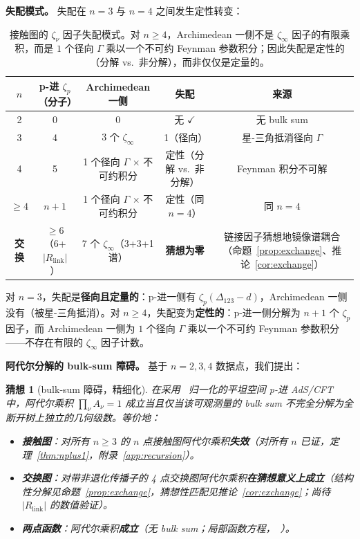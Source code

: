 \documentclass[11pt,a4paper]{ctexart}
\newtheorem{conjecture}{猜想}[section]
\theoremstyle{remark}
\begin{document}
\medskip\noindent
\textbf{失配模式。}
失配在 $n = 3$ 与 $n = 4$ 之间发生定性转变：

\begin{table}[H]
\centering
\caption{接触图的 $\zeta_\nu$ 因子失配模式。对 $n \geq 4$，Archimedean 一侧不是 $\zeta_\infty$ 因子的有限乘积，而是 $1$ 个径向 $\Gamma$ 乘以一个不可约 Feynman 参数积分；因此失配是定性的（分解 vs.\ 非分解），而非仅仅是定量的。}
\label{tab:mismatch}
\begin{tabular}{ccccc}
\toprule
$n$ & p-进 $\zeta_p$（分子） & Archimedean 一侧 & 失配 & 来源 \\
\midrule
2 & 0 & 0 & 无 $\checkmark$ & 无 bulk sum \\
3 & 4 & 3 个 $\zeta_\infty$ & 1（径向） & 星-三角抵消径向 $\Gamma$ \\
4 & 5 & 1 个径向 $\Gamma$ $\times$ 不可约积分 & 定性（分解 vs.\ 非分解） & Feynman 积分不可解 \\
$\geq 4$ & $n{+}1$ & 1 个径向 $\Gamma$ $\times$ 不可约积分 & 定性（同 $n=4$） & 同 $n=4$ \\
\textbf{交换} & $\geq 6$（6+$|R_{\mathrm{link}}|$） & 7 个 $\zeta_\infty$（3+3+1 谱） & \textbf{猜想为零} & 链接因子猜想地镜像谱耦合（命题~\ref{prop:exchange}、推论~\ref{cor:exchange}） \\
\bottomrule
\end{tabular}
\end{table}

对 $n = 3$，失配是\textbf{径向且定量的}：p-进一侧有 $\zeta_p(\Delta_{123}{-}d)$，Archimedean 一侧没有（被星-三角抵消）。对 $n \geq 4$，失配变为\textbf{定性的}：p-进一侧分解为 $n{+}1$ 个 $\zeta_p$ 因子，而 Archimedean 一侧为 $1$ 个径向 $\Gamma$ 乘以一个不可约 Feynman 参数积分——不存在有限的 $\zeta_\infty$ 因子计数。

\medskip\noindent
\textbf{阿代尔分解的 bulk-sum 障碍。}
基于 $n = 2, 3, 4$ 数据点，我们提出：

\begin{conjecture}[bulk-sum 障碍，精细化]
\label{conj:bulk-sum}
在采用~\cite{HJ24} 归一化的平坦空间 p-进 AdS/CFT 中，阿代尔乘积 $\prod_\nu A_\nu = 1$ 成立当且仅当该可观测量的 bulk sum 不\emph{完全分解}为全断开树上独立的几何级数。等价地：
\begin{itemize}[leftmargin=2em]
    \item \textbf{接触图}：对所有 $n \geq 3$ 的 $n$ 点接触图阿代尔乘积\textbf{失效}（对所有 $n$ 已证，定理~\ref{thm:nplus1}，附录~\ref{app:recursion}）。
    \item \textbf{交换图}：对带非退化传播子的 4 点交换图阿代尔乘积\textbf{在猜想意义上成立}（结构性分解见命题~\ref{prop:exchange}，猜想性匹配见推论~\ref{cor:exchange}；尚待 $|R_{\mathrm{link}}|$ 的数值验证）。
    \item \textbf{两点函数}：阿代尔乘积\textbf{成立}（无 bulk sum；局部函数方程，~\cite{HSYZ20}）。
\end{itemize}
\end{conjecture}
\end{document}
